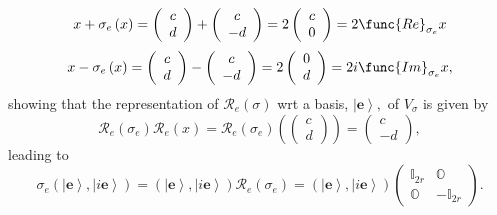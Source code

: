 \documentclass[aps,preprint]{revtex4}
\begin{document}
\begin{equation*}
x+\sigma_{e}\left( x\right) =\left( 
\begin{array}{c}
c \\ 
d%
\end{array}
\right) +\left( 
\begin{array}{c}
c \\ 
-d%
\end{array}
\right) =2\left( 
\begin{array}{c}
c \\ 
0%
\end{array}
\right) =2\func{Re}_{\sigma_{e}}x
\end{equation*}%
\begin{equation*}
x-\sigma_{e}\left( x\right) =\left( 
\begin{array}{c}
c \\ 
d%
\end{array}
\right) -\left( 
\begin{array}{c}
c \\ 
-d%
\end{array}
\right) =2\left( 
\begin{array}{c}
0 \\ 
d%
\end{array}
\right) =2i\func{Im}_{\sigma_{e}}x,
\end{equation*}
showing that the representation of $\mathcal{R}_{e}\left( \sigma\right) $
wrt a basis, $\left\vert \mathbf{e}\right\rangle ,$ of $V_{\sigma}$ is given
by 
\begin{equation}
\mathcal{R}_{e}\left( \sigma_{e}\right) \mathcal{R}_{e}\left( x\right) =%
\mathcal{R}_{e}\left( \sigma_{e}\right) \left( \left( 
\begin{array}{c}
c \\ 
d%
\end{array}
\right) \right) =\left( 
\begin{array}{c}
c \\ 
-d%
\end{array}
\right) ,
\end{equation}
leading to%
\begin{equation}
\sigma_{e}\left( \left\vert \mathbf{e}\right\rangle ,\left\vert i\mathbf{e}%
\right\rangle \right) =\left( \left\vert \mathbf{e}\right\rangle ,\left\vert
i\mathbf{e}\right\rangle \right) \mathcal{R}_{e}\left( \sigma_{e}\right)
=\left( \left\vert \mathbf{e}\right\rangle ,\left\vert i\mathbf{e}%
\right\rangle \right) \left( 
\begin{array}{cc}
\mathbb{I}_{2r} & \mathbb{O} \\ 
\mathbb{O} & -\mathbb{I}_{2r}%
\end{array}
\right) .
\end{equation}
\end{document}
